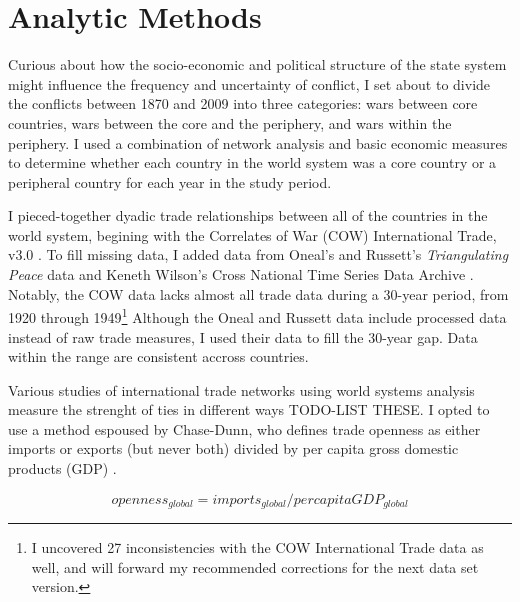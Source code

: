 \documentclass[pdftex,12pt]{article}
\begin{document}
\section{Analytic Methods}
%
%
Curious about how the socio-economic and political structure of the state system might influence the frequency and uncertainty of conflict, I set about to divide the conflicts between 1870 and 2009 into three categories: wars between core countries, wars between the core and the periphery, and wars within the periphery. 
I used a combination of network analysis and basic economic measures to determine whether each country in the world system was a core country or a peripheral country for each year in the study period.

I pieced-together dyadic trade relationships between all of the countries in the world system, begining with the Correlates of War (COW) International Trade, v3.0 \parencite{Barbieri2012}.
To fill missing data, I added data from Oneal's and Russett's \emph{Triangulating Peace} data \parencite{Oneal} and Keneth Wilson's Cross National Time Series Data Archive \parencite{Wilson2014, Banks1984}.
Notably, the COW data lacks almost all trade data during a 30-year period, from 1920 through 1949\footnote{I uncovered 27 inconsistencies with the COW International Trade data as well, and will forward my recommended corrections for the next data set version.} 
Although the Oneal and Russett data include processed data instead of raw trade measures, I used their data to fill the 30-year gap.
Data within the range are consistent accross countries.

Various studies of international trade networks using world systems analysis measure the strenght of ties in different ways TODO-LIST THESE.
I opted to use a method espoused by Chase-Dunn, who defines trade openness as either imports or exports (but never both) divided by per capita gross domestic products (GDP) \parencite{Chase-Dunn2000}. 

\begin{equation} \label{eq:cd_open}
{openness_{global}}={imports_{global}}/{per capita GDP_{global}}
\end{equation}
\end{document}

